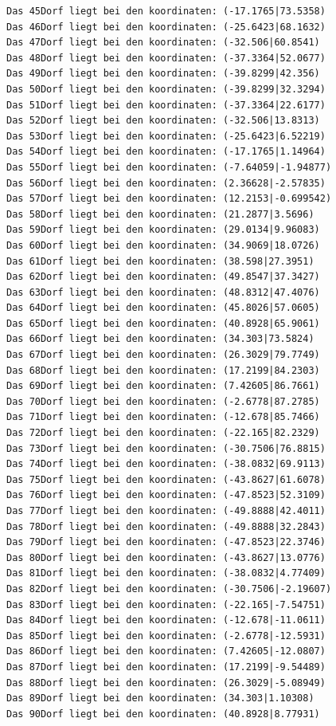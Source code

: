 \documentclass{article}
\begin{document}
\begin{verbatim}
Das 45Dorf liegt bei den koordinaten: (-17.1765|73.5358)
Das 46Dorf liegt bei den koordinaten: (-25.6423|68.1632)
Das 47Dorf liegt bei den koordinaten: (-32.506|60.8541)
Das 48Dorf liegt bei den koordinaten: (-37.3364|52.0677)
Das 49Dorf liegt bei den koordinaten: (-39.8299|42.356)
Das 50Dorf liegt bei den koordinaten: (-39.8299|32.3294)
Das 51Dorf liegt bei den koordinaten: (-37.3364|22.6177)
Das 52Dorf liegt bei den koordinaten: (-32.506|13.8313)
Das 53Dorf liegt bei den koordinaten: (-25.6423|6.52219)
Das 54Dorf liegt bei den koordinaten: (-17.1765|1.14964)
Das 55Dorf liegt bei den koordinaten: (-7.64059|-1.94877)
Das 56Dorf liegt bei den koordinaten: (2.36628|-2.57835)
Das 57Dorf liegt bei den koordinaten: (12.2153|-0.699542)
Das 58Dorf liegt bei den koordinaten: (21.2877|3.5696)
Das 59Dorf liegt bei den koordinaten: (29.0134|9.96083)
Das 60Dorf liegt bei den koordinaten: (34.9069|18.0726)
Das 61Dorf liegt bei den koordinaten: (38.598|27.3951)
Das 62Dorf liegt bei den koordinaten: (49.8547|37.3427)
Das 63Dorf liegt bei den koordinaten: (48.8312|47.4076)
Das 64Dorf liegt bei den koordinaten: (45.8026|57.0605)
Das 65Dorf liegt bei den koordinaten: (40.8928|65.9061)
Das 66Dorf liegt bei den koordinaten: (34.303|73.5824)
Das 67Dorf liegt bei den koordinaten: (26.3029|79.7749)
Das 68Dorf liegt bei den koordinaten: (17.2199|84.2303)
Das 69Dorf liegt bei den koordinaten: (7.42605|86.7661)
Das 70Dorf liegt bei den koordinaten: (-2.6778|87.2785)
Das 71Dorf liegt bei den koordinaten: (-12.678|85.7466)
Das 72Dorf liegt bei den koordinaten: (-22.165|82.2329)
Das 73Dorf liegt bei den koordinaten: (-30.7506|76.8815)
Das 74Dorf liegt bei den koordinaten: (-38.0832|69.9113)
Das 75Dorf liegt bei den koordinaten: (-43.8627|61.6078)
Das 76Dorf liegt bei den koordinaten: (-47.8523|52.3109)
Das 77Dorf liegt bei den koordinaten: (-49.8888|42.4011)
Das 78Dorf liegt bei den koordinaten: (-49.8888|32.2843)
Das 79Dorf liegt bei den koordinaten: (-47.8523|22.3746)
Das 80Dorf liegt bei den koordinaten: (-43.8627|13.0776)
Das 81Dorf liegt bei den koordinaten: (-38.0832|4.77409)
Das 82Dorf liegt bei den koordinaten: (-30.7506|-2.19607)
Das 83Dorf liegt bei den koordinaten: (-22.165|-7.54751)
Das 84Dorf liegt bei den koordinaten: (-12.678|-11.0611)
Das 85Dorf liegt bei den koordinaten: (-2.6778|-12.5931)
Das 86Dorf liegt bei den koordinaten: (7.42605|-12.0807)
Das 87Dorf liegt bei den koordinaten: (17.2199|-9.54489)
Das 88Dorf liegt bei den koordinaten: (26.3029|-5.08949)
Das 89Dorf liegt bei den koordinaten: (34.303|1.10308)
Das 90Dorf liegt bei den koordinaten: (40.8928|8.77931)

\end{verbatim}
\end{document}
